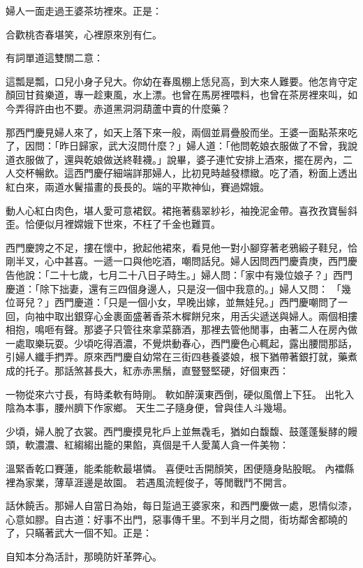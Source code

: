 \begin{showcontents}{}
婦人一面走過王婆茶坊裡來。正是：

合歡桃杏春堪笑，心裡原來別有仁。

有詞單道這雙關二意：

這瓢是瓢，口兒小身子兒大。你幼在春風棚上恁兒高，到大來人難要。他怎肯守定顏回甘貧樂道，專一趁東風，水上漂。也曾在馬房裡喂料，也曾在茶房裡來叫，如今弄得許由也不要。赤道黑洞洞葫蘆中賣的什麼藥？

那西門慶見婦人來了，如天上落下來一般，兩個並肩疊股而坐。王婆一面點茶來吃了，因問：「昨日歸家，武大沒問什麼？」婦人道：「他問乾娘衣服做了不曾，我說道衣服做了，還與乾娘做送終鞋襪。」說畢，婆子連忙安排上酒來，擺在房內，二人交杯暢飲。這西門慶仔細端詳那婦人，比初見時越發標緻。吃了酒，粉面上透出紅白來，兩道水鬢描畫的長長的。端的平欺神仙，賽過嫦娥。

動人心紅白肉色，堪人愛可意裙釵。裙拖著翡翠紗衫，袖挽泥金帶。喜孜孜寶髻斜歪。恰便似月裡嫦娥下世來，不枉了千金也難買。

西門慶誇之不足，摟在懷中，掀起他裙來，看見他一對小腳穿著老鴉緞子鞋兒，恰剛半叉，心中甚喜。一遞一口與他吃酒，嘲問話兒。婦人因問西門慶貴庚，西門慶告他說：「二十七歲，七月二十八日子時生。」婦人問：「家中有幾位娘子？」西門慶道：「除下拙妻，還有三四個身邊人，只是沒一個中我意的。」婦人又問： 「幾位哥兒？」西門慶道：「只是一個小女，早晚出嫁，並無娃兒。」西門慶嘲問了一回，向袖中取出銀穿心金裹面盛著香茶木樨餅兒來，用舌尖遞送與婦人。兩個相摟相抱，鳴咂有聲。那婆子只管往來拿菜篩酒，那裡去管他閒事，由著二人在房內做一處取樂玩耍。少頃吃得酒濃，不覺烘動春心，西門慶色心輒起，露出腰間那話，引婦人纖手捫弄。原來西門慶自幼常在三街四巷養婆娘，根下猶帶著銀打就，藥煮成的托子。那話煞甚長大，紅赤赤黑鬚，直豎豎堅硬，好個東西：

一物從來六寸長，有時柔軟有時剛。
軟如醉漢東西倒，硬似風僧上下狂。
出牝入陰為本事，腰州臍下作家鄉。
天生二子隨身便，曾與佳人斗幾場。

少頃，婦人脫了衣裳。西門慶摸見牝戶上並無毳毛，猶如白馥馥、鼓蓬蓬髮酵的饅頭，軟濃濃、紅縐縐出籠的果餡，真個是千人愛萬人貪一件美物：

溫緊香乾口賽蓮，能柔能軟最堪憐。
喜便吐舌開顏笑，困便隨身貼股眠。
內襠縣裡為家業，薄草涯邊是故園。
若遇風流輕俊子，等閒戰鬥不開言。

話休饒舌。那婦人自當日為始，每日踅過王婆家來，和西門慶做一處，恩情似漆，心意如膠。自古道：好事不出門，惡事傳千里。不到半月之間，街坊鄰舍都曉的了，只瞞著武大一個不知。正是：

自知本分為活計，那曉防奸革弊心。


\end{showcontents}
